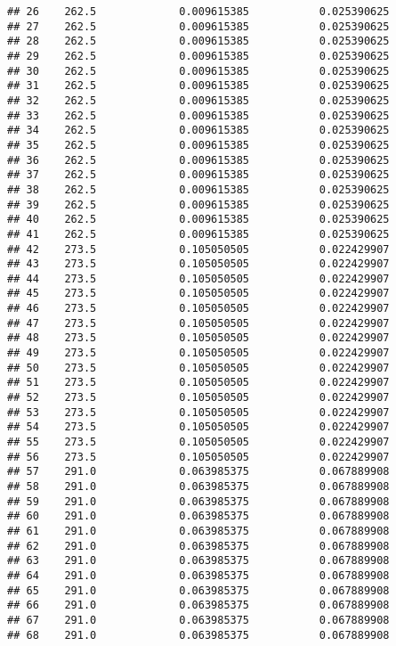 \documentclass[]{article}
\begin{document}
\begin{verbatim}
## 26    262.5             0.009615385           0.025390625
## 27    262.5             0.009615385           0.025390625
## 28    262.5             0.009615385           0.025390625
## 29    262.5             0.009615385           0.025390625
## 30    262.5             0.009615385           0.025390625
## 31    262.5             0.009615385           0.025390625
## 32    262.5             0.009615385           0.025390625
## 33    262.5             0.009615385           0.025390625
## 34    262.5             0.009615385           0.025390625
## 35    262.5             0.009615385           0.025390625
## 36    262.5             0.009615385           0.025390625
## 37    262.5             0.009615385           0.025390625
## 38    262.5             0.009615385           0.025390625
## 39    262.5             0.009615385           0.025390625
## 40    262.5             0.009615385           0.025390625
## 41    262.5             0.009615385           0.025390625
## 42    273.5             0.105050505           0.022429907
## 43    273.5             0.105050505           0.022429907
## 44    273.5             0.105050505           0.022429907
## 45    273.5             0.105050505           0.022429907
## 46    273.5             0.105050505           0.022429907
## 47    273.5             0.105050505           0.022429907
## 48    273.5             0.105050505           0.022429907
## 49    273.5             0.105050505           0.022429907
## 50    273.5             0.105050505           0.022429907
## 51    273.5             0.105050505           0.022429907
## 52    273.5             0.105050505           0.022429907
## 53    273.5             0.105050505           0.022429907
## 54    273.5             0.105050505           0.022429907
## 55    273.5             0.105050505           0.022429907
## 56    273.5             0.105050505           0.022429907
## 57    291.0             0.063985375           0.067889908
## 58    291.0             0.063985375           0.067889908
## 59    291.0             0.063985375           0.067889908
## 60    291.0             0.063985375           0.067889908
## 61    291.0             0.063985375           0.067889908
## 62    291.0             0.063985375           0.067889908
## 63    291.0             0.063985375           0.067889908
## 64    291.0             0.063985375           0.067889908
## 65    291.0             0.063985375           0.067889908
## 66    291.0             0.063985375           0.067889908
## 67    291.0             0.063985375           0.067889908
## 68    291.0             0.063985375           0.067889908

\end{verbatim}
\end{document}
